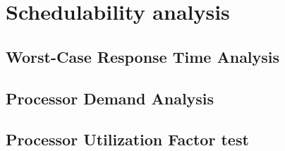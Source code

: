 \section{Schedulability analysis}

\subsection{Worst-Case Response Time Analysis}

\subsection{Processor Demand Analysis}

\subsection{Processor Utilization Factor test}
